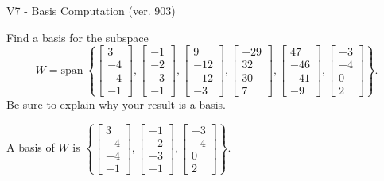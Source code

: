 \begin{exercise}
  \begin{exerciseTitle}V7 - Basis Computation (ver. 903)\end{exerciseTitle}
  \begin{exerciseStatement}
    Find a basis for the subspace 
\[W=\mathrm{span}\ \left\{\left[\begin{array}{r}
3 \\
-4 \\
-4 \\
-1
\end{array}\right] , \left[\begin{array}{r}
-1 \\
-2 \\
-3 \\
-1
\end{array}\right] , \left[\begin{array}{r}
9 \\
-12 \\
-12 \\
-3
\end{array}\right] , \left[\begin{array}{r}
-29 \\
32 \\
30 \\
7
\end{array}\right] , \left[\begin{array}{r}
47 \\
-46 \\
-41 \\
-9
\end{array}\right] , \left[\begin{array}{r}
-3 \\
-4 \\
0 \\
2
\end{array}\right]\right\}.\]
 Be sure to explain why your result is a basis.


  \end{exerciseStatement}
  \begin{exerciseAnswer}
   A basis of \(W\) is  \(\left\{\left[\begin{array}{r}
3 \\
-4 \\
-4 \\
-1
\end{array}\right] , \left[\begin{array}{r}
-1 \\
-2 \\
-3 \\
-1
\end{array}\right] , \left[\begin{array}{r}
-3 \\
-4 \\
0 \\
2
\end{array}\right]\right\}\).
  


  \end{exerciseAnswer}
\end{exercise}